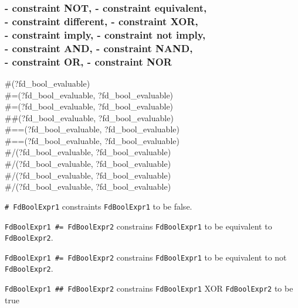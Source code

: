\subsubsection{ - constraint NOT,
                - constraint equivalent, \\
                - constraint different,
                - constraint XOR, \\
                - constraint imply,
                - constraint not imply, \\
                - constraint AND,
                - constraint NAND, \\
                - constraint OR,
                - constraint NOR}

\begin{TemplatesOneCol}
\#{\bs}(?fd\_bool\_evaluable)\\
\#{\lt}={\gt}(?fd\_bool\_evaluable, ?fd\_bool\_evaluable)\\
\#{\bs}{\lt}={\gt}(?fd\_bool\_evaluable, ?fd\_bool\_evaluable)\\
\#\#(?fd\_bool\_evaluable, ?fd\_bool\_evaluable)\\
\#=={\gt}(?fd\_bool\_evaluable, ?fd\_bool\_evaluable)\\
\#{\bs}=={\gt}(?fd\_bool\_evaluable, ?fd\_bool\_evaluable)\\
\#/{\bs}(?fd\_bool\_evaluable, ?fd\_bool\_evaluable)\\
\#{\bs}/{\bs}(?fd\_bool\_evaluable, ?fd\_bool\_evaluable)\\
\#{\bs}/(?fd\_bool\_evaluable, ?fd\_bool\_evaluable)\\
\#{\bs}{\bs}/(?fd\_bool\_evaluable, ?fd\_bool\_evaluable)

\end{TemplatesOneCol}

\Description

\texttt{\#{\bs} FdBoolExpr1} constraints \texttt{FdBoolExpr1} to be
false.

\texttt{FdBoolExpr1 \#{\lt}={\gt} FdBoolExpr2} constrains
\texttt{FdBoolExpr1} to be equivalent to \texttt{FdBoolExpr2}.

\texttt{FdBoolExpr1 \#{\bs}{\lt}={\gt} FdBoolExpr2} constrains
\texttt{FdBoolExpr1} to be equivalent to not \texttt{FdBoolExpr2}.

\texttt{FdBoolExpr1 \#\# FdBoolExpr2} constrains \texttt{FdBoolExpr1} XOR
\texttt{FdBoolExpr2} to be true

